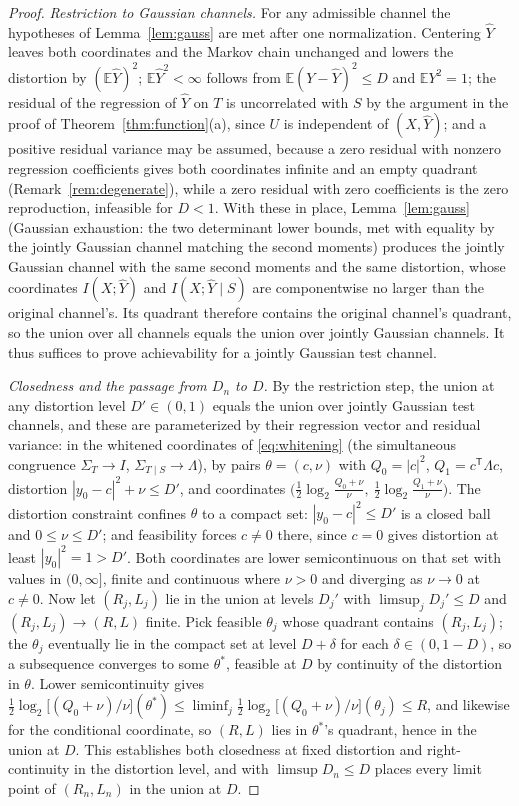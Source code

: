 \documentclass[11pt,onecolumn]{IEEEtran}
\newcommand{\E}{\mathbb{E}}
\newcommand{\hY}{\widehat{Y}}
\begin{document}
\begin{proof}
\emph{Restriction to Gaussian channels.} For any admissible channel the
hypotheses of Lemma~\ref{lem:gauss} are met after one normalization.
Centering $\hY$ leaves both coordinates and the Markov chain unchanged
and lowers the distortion by $(\E\hY)^2$; $\E\hY^2<\infty$ follows from
$\E(Y-\hY)^2\le D$ and $\E Y^2=1$; the residual of the regression of
$\hY$ on $T$ is uncorrelated with $S$ by the argument in the proof of
Theorem~\ref{thm:function}(a), since $U$ is independent of $(X,\hY)$;
and a positive residual variance may be assumed, because a zero
residual with nonzero regression coefficients gives both coordinates
infinite and an empty quadrant (Remark~\ref{rem:degenerate}), while a
zero residual with zero coefficients is the zero reproduction, infeasible
for $D<1$. With these in place,
Lemma~\ref{lem:gauss} (Gaussian exhaustion: the two determinant lower
bounds, met with equality by the jointly Gaussian channel matching the
second moments) produces the jointly Gaussian channel with the
same second moments and the same distortion, whose coordinates
$I(X;\hY)$ and $I(X;\hY\mid S)$ are componentwise no larger than the
original channel's. Its quadrant therefore
contains the original channel's quadrant, so the union over all
channels equals the union over jointly Gaussian channels. It thus
suffices to prove achievability for a jointly Gaussian test channel.

\emph{Closedness and the passage from $D_n$ to $D$.} By the restriction
step, the union at any distortion level $D'\in(0,1)$ equals the
union over jointly Gaussian test channels, and these are parameterized
by their regression vector and residual variance: in the whitened
coordinates of \eqref{eq:whitening} (the simultaneous congruence
$\Sigma_T\to I$, $\Sigma_{T\mid S}\to\Lambda$), by pairs
$\theta=(c,\nu)$ with
$Q_0=|c|^2$, $Q_1=c^{\mathsf T}\Lambda c$, distortion
$|y_0-c|^2+\nu\le D'$, and coordinates
$\bigl(\tfrac12\log_2\tfrac{Q_0+\nu}{\nu},\
\tfrac12\log_2\tfrac{Q_1+\nu}{\nu}\bigr)$. The distortion constraint
confines $\theta$ to a compact set: $|y_0-c|^2\le D'$ is a closed ball
and $0\le\nu\le D'$; and feasibility forces $c\ne0$ there, since $c=0$
gives distortion at least $|y_0|^2=1>D'$. Both coordinates are lower
semicontinuous on that set with values in $(0,\infty]$, finite and
continuous where $\nu>0$ and diverging as $\nu\to0$ at $c\ne0$. Now let
$(R_j,L_j)$ lie in the union at levels $D_j'$ with
$\limsup_jD_j'\le D$ and $(R_j,L_j)\to(R,L)$ finite. Pick feasible
$\theta_j$ whose quadrant contains $(R_j,L_j)$; the $\theta_j$
eventually lie in the compact set at level $D+\delta$ for each
$\delta\in(0,1-D)$, so a subsequence converges to some $\theta^*$, feasible at
$D$ by continuity of the distortion in $\theta$. Lower semicontinuity
gives $\tfrac12\log_2\bigl[(Q_0+\nu)/\nu\bigr](\theta^*)\le
\liminf_j\tfrac12\log_2\bigl[(Q_0+\nu)/\nu\bigr](\theta_j)\le R$, and
likewise for the conditional coordinate, so $(R,L)$ lies in
$\theta^*$'s quadrant, hence in the union at $D$. This establishes
both closedness at fixed distortion and right-continuity in the
distortion level, and with $\limsup D_n\le D$ places every limit point
of $(R_n,L_n)$ in the union at $D$.



\end{proof}
\end{document}

